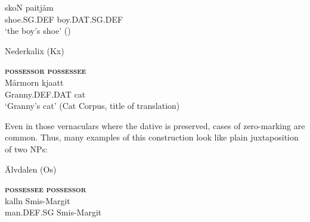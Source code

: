  \ea\label{}
\gll skoN  paitjåm  \\


shoe.SG.DEF  boy.DAT.SG.DEF  \\

\glt ‘the boy’s shoe’ (\citet[22]{Marklund1976})

\z

\item 

\label{bkm:Ref95906318}Nederkalix (Kx)



 \ea\label{}
\gll \textbf{\textsc{possessor}} \textbf{\textsc{possessee}} \\

 \ea\label{}
\gll Mårmorn  kjaatt\\


Granny.DEF.DAT  cat\\

\glt ‘Granny’s cat’ (Cat Corpus, title of translation)

\z

Even in those vernaculars where the dative is preserved, cases of zero-marking are common. Thus, many examples of this construction look like plain juxtaposition of two NPs:


\item 

\label{bkm:Ref134419452}Älvdalen (Os)



 \ea\label{}
\gll \textbf{\textsc{possessee}} \textbf{\textsc{possessor}} \\

 \ea\label{}
\gll kalln  Smis-Margit \\


man.DEF.SG  Smis-Margit\\

